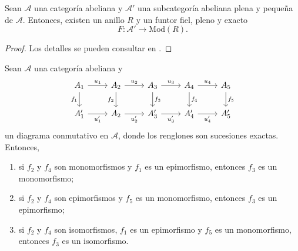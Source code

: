 \documentclass[tesis]{subfiles}
\begin{document}
\begin{Teo}\label{Mendoza-1.10.10}
    Sean $\mathscr{A}$ una categoría abeliana y $\mathscr{A}'$ una subcategoría abeliana plena y pequeña de $\mathscr{A}$. Entonces, existen un anillo $R$ y un funtor fiel, pleno y exacto
    \[
    F:\mathscr{A}'\to \text{Mod}(R).
    \] 
\end{Teo}

\begin{proof}

    Los detalles se pueden consultar en \cite[Theorem 7.15]{Tan-Junhan}.
\end{proof}

\begin{Lema}\label{Mendoza_Ejer.62}
    Sean $\mathscr{A}$ una categoría abeliana y
    \begin{equation}\label{eq: Mendoza_Ejer.62-1}
        \begin{tikzcd}
            A_1 \arrow[]{d}[swap]{f_1} \arrow[]{r}[]{u_1} &A_2 \arrow[]{d}[swap]{f_2} \arrow[]{r}[]{u_2} &A_3 \arrow[]{d}[]{f_3} \arrow[]{r}[]{u_3} &A_4 \arrow[]{d}[]{f_4} \arrow[]{r}[]{u_4} &A_5 \arrow[]{d}[]{f_5} \\
            A_1' \arrow[]{r}[swap]{u_1'} &A_2 \arrow[]{r}[swap]{u_2'} &A_3' \arrow[]{r}[swap]{u_3'} &A_4' \arrow[]{r}[swap]{u_4'} &A_5'
        \end{tikzcd}
    \end{equation}
    un diagrama conmutativo en $\mathscr{A}$, donde los renglones son sucesiones exactas. Entonces,

    \begin{enumerate}[label=(\alph*)]
    
        \item si $f_2$ y $f_4$ son monomorfismos y $f_1$ es un epimorfismo, entonces $f_3$ es un monomorfismo; \\

        \item si $f_2$ y $f_4$ son epimorfismos y $f_5$ es un monomorfismo, entonces $f_3$ es un epimorfismo; \\

        \item si $f_2$ y $f_4$ son isomorfismos, $f_1$ es un epimorfismo y $f_5$ es un monomorfismo, entonces $f_3$ es un isomorfismo.
    \end{enumerate}
\end{Lema}
\end{document}
